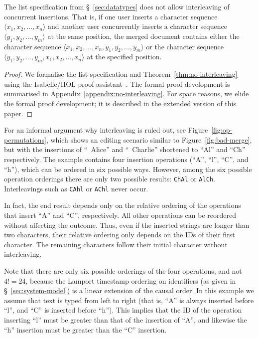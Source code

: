 \begin{theorem}\label{thm:no-interleaving}
    The list specification from \S~\ref{sec:datatypes} does not allow interleaving of concurrent insertions.
    That is, if one user inserts a character sequence $\langle x_1, x_2, \dots, x_n \rangle$ and another user concurrently inserts a character sequence $\langle y_1, y_2, \dots, y_m \rangle$ at the same position, the merged document contains either the character sequence $\langle x_1, x_2, \dots, x_n, y_1, y_2, \dots, y_m \rangle$ or the character sequence $\langle y_1, y_2, \dots, y_m, x_1, x_2, \dots, x_n \rangle$ at the specified position.
\end{theorem}
\begin{proof}
    We formalise the list specification and Theorem~\ref{thm:no-interleaving} using the Isabelle/HOL proof assistant~\cite{DBLP:conf/tphol/WenzelPN08}.
    \ifarxiv
        The formal proof development is summarised in Appendix~\ref{appendix:no-interleaving}.
    \else
        For space reasons, we elide the formal proof development; it is described in the extended version of this paper.
    \fi
\end{proof}

For an informal argument why interleaving is ruled out, see Figure~\ref{fig:op-permutations}, which shows an editing scenario similar to Figure~\ref{fig:bad-merge}, but with the insertions of ``~Alice'' and ``~Charlie'' shortened to ``Al'' and ``Ch'' respectively.
The example contains four insertion operations (``A'', ``l'', ``C'', and ``h''), which can be ordered in six possible ways.
However, among the six possible operation orderings there are only two possible results: \texttt{ChAl} or \texttt{AlCh}.
Interleavings such as \texttt{CAhl} or \texttt{AChl} never occur.

In fact, the end result depends only on the relative ordering of the operations that insert ``A'' and ``C'', respectively.
All other operations can be reordered without affecting the outcome.
Thus, even if the inserted strings are longer than two characters, their relative ordering only depends on the IDs of their first character.
The remaining characters follow their initial character without interleaving.

Note that there are only six possible orderings of the four operations, and not $4! = 24$, because the Lamport timestamp ordering on identifiers (as given in \S~\ref{sec:system-model}) is a linear extension of the causal order.
In this example we assume that text is typed from left to right (that is, ``A'' is always inserted before ``l'', and ``C'' is inserted before ``h'').
This implies that the ID of the operation inserting ``l'' must be greater than that of the insertion of ``A'', and likewise the ``h'' insertion must be greater than the ``C'' insertion.

